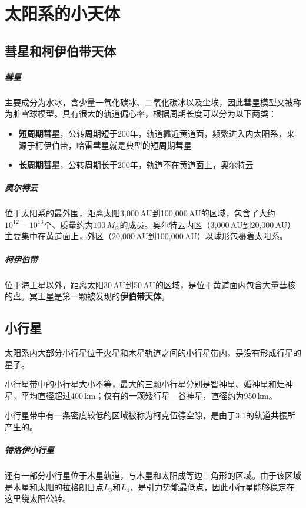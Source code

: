 \chapter{太阳系的小天体}
\section{彗星和柯伊伯带天体}
\paragraph{彗星}
主要成分为水冰，含少量一氧化碳冰、二氧化碳冰以及尘埃，因此彗星模型又被称为脏雪球模型。具有很大的轨道偏心率，根据周期长度可以分为以下两类：
\begin{itemize}
  \item \textbf{短周期彗星}，公转周期短于200年，轨道靠近黄道面，频繁进入内太阳系，来源于柯伊伯带，哈雷彗星就是典型的短周期彗星
  \item \textbf{长周期彗星}，公转周期长于200年，轨道不在黄道面上，奥尔特云
\end{itemize}

\paragraph{奥尔特云}
位于太阳系的最外围，距离太阳3,000\,AU到100,000\,AU的区域，包含了大约$10^{12}-10^{13}$个、质量约为$100\,M_\odot$的成员。奥尔特云内区（3,000\,AU到20,000\,AU）主要集中在黄道面上，外区（20,000\,AU到100,000\,AU）以球形包裹着太阳系。

\paragraph{柯伊伯带}
位于海王星以外，距离太阳30\,AU到50\,AU的区域，是位于黄道面内包含大量彗核的盘。冥王星是第一颗被发现的\textbf{伊伯带天体}。

\section{小行星}
太阳系内大部分小行星位于火星和木星轨道之间的小行星带内，是没有形成行星的星子。

小行星带中的小行星大小不等，最大的三颗小行星分别是智神星、婚神星和灶神星，平均直径超过400\,km；仅有的一颗矮行星—谷神星，直径约为950\,km。

小行星带中有一条密度较低的区域被称为柯克伍德空隙，是由于3:1的轨道共振所产生的。

\paragraph{特洛伊小行星}
还有一部分小行星位于木星轨道，与木星和太阳成等边三角形的区域。由于该区域是木星和太阳的拉格朗日点$L_3$和$L_4$，是引力势能最低点，因此小行星能够稳定在这里绕太阳公转。
